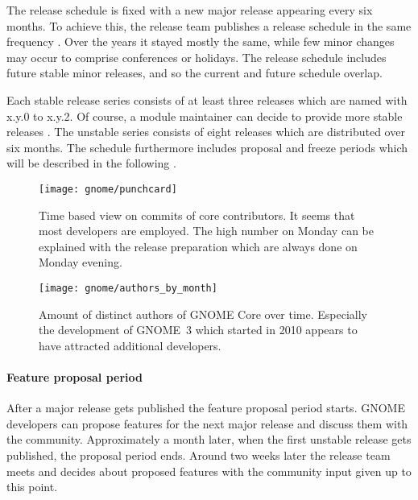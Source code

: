 The release schedule is fixed with a new major release appearing every six
months. To achieve this, the release team publishes a release schedule in the
same frequency \cite{GNOMEDevelopmentSchedule}. Over the years it stayed mostly
the same, while few minor changes may occur to comprise conferences or
holidays. The release schedule includes future stable minor releases, and so
the current and future schedule overlap.

Each stable release series consists of at least three releases which are named
with x.y.0 to x.y.2. Of course, a module maintainer can decide to provide more
stable releases \cite{GNOMEReleaseTeam}. The unstable series consists of eight
releases which are distributed over six months. The schedule furthermore
includes proposal and freeze periods which will be described in the following
\cite{GNOMEDevelopmentSchedule,GNOMESchedule}.

\vfill
\begin{figure}[bhtp]
  \centering
  \texttt{[image: gnome/punchcard]}
  \caption[Time Based View on Commits, GNOME]
  {Time based view on commits of core contributors. It seems that most
    developers are employed. The high number on Monday can be explained with
    the release preparation which are always done on Monday evening.}
  \label{fig:gnome:p}
\end{figure}

\begin{figure}[htbp]
  \centering
  \texttt{[image: gnome/authors\_by\_month]}
  \caption[Authors by Month, GNOME]
  {Amount of distinct authors of GNOME Core over time. Especially the
    development of GNOME~3 which started in 2010 appears to have attracted
    additional developers.}
  \label{fig:gnome:abm}
\end{figure}

\paragraph{Feature proposal period}

After a major release gets published the feature proposal period starts. GNOME
developers can propose features for the next major release and discuss them
with the community. Approximately a month later, when the first unstable
release gets published, the proposal period ends. Around two weeks later the
release team meets and decides about proposed features with the community input
given up to this point.

